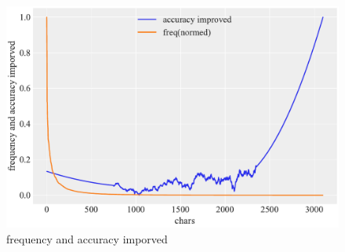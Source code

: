 
\begin{figure}[!t]
    \begin{center}
    \includegraphics[width=1.0\linewidth]{figures/freqvsimprovement.pdf}
    \end{center}
    \caption{frequency and accuracy imporved}
    \label{fig:freqvsimprovement}
\end{figure}

    